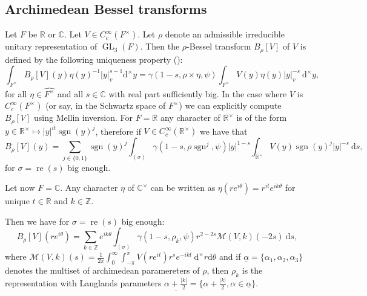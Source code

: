 \documentclass[a4paper,11pt]{amsart}
\theoremstyle{definition}
\newcommand{\R}{\mathbb{R}}
\newcommand{\Z}{\mathbb{Z}}
\newcommand{\gelle}{\operatorname{GL}}
\newcommand{\real}{\operatorname{re}}
\newcommand{\CC}{\mathbb{C}}
\begin{document}
\subsection{Archimedean Bessel transforms}Let $F$ be $\R$ or $\CC$. Let $V\in C_c^{\infty}(F^{\times})$. Let $\rho$ denote an admissible irreducible unitary representation of $\gelle_3(F)$.  
Then the $\rho$-Bessel transform $B_{\rho}[V]$ of $V$ is defined by the following uniqueness property (\cite{IchinoTemplier}): 
\begin{equation*}
     \int_{F^{\times}}B_{\rho}[{V}](y)\eta(y)^{-1}\vert{y}\vert_v^{s-1}\mathrm{d}^{\times}y =  \gamma(1-s,\rho\times \eta,\psi)\int_{F^{\times}}V(y)\eta(y)\vert{y}\vert_v^{-s}\ \mathrm{d}^{\times}y,
\end{equation*}
for all $\eta \in \widehat{F^{\times}}$ and all $s\in \CC$ with real part sufficiently big.
In the case where $V$ is $C_c^{\infty}(F^{\times})$ (or say, in the Schwartz space of $F^{\times}$) we can explicitly compute $B_{\rho}[V]$ using Mellin inversion.
For $F=\R$ any character of $\R^\times$ is of the form $y \in \R^{\times} \mapsto \vert{y}\vert^{it} \operatorname{sgn}(y)^{j}  $, therefore if $V \in C_c^{\infty}(\R^{\times})$ we have that 
\[B_{\rho}[V](y) = \sum_{j\in\{0,1\}} \operatorname{sgn}(y)^j\int_{(\sigma)}\gamma(1-s,\rho\operatorname{sgn}^{j},\psi)\vert{y}\vert^{1-s}\int_{\R^{\times}}V(y)\operatorname{sgn}(y)^j\vert{y}\vert^{-s}\ \mathrm{d}s,\]
for $\sigma=\real(s)$ big enough.


Let now $F=\CC$. Any character $\eta$ of $\CC^{\times}$ can be written as $\eta(re^{i\theta}) = r^{it}e^{ik\theta}$ for unique $t\in \R$ and $k\in \Z$. 

Then we have for $\sigma = \real(s)$ big enough:
\begin{equation*}
    B_{\rho}[V](re^{i\theta}) = \sum_{k\in \Z}e^{ik\theta}\int_{(\sigma)}\gamma(1-s,\rho_k,\psi)r^{2-2s}\mathcal{M}(V,k)(-2s) \ \mathrm{d}s,
\end{equation*}
where $\mathcal{M}(V,k)(s) = \frac{1}{2\pi}\int_{0}^{\infty}\int_{-\pi}^{\pi}V(re^{it})r^{s}e^{-ikt}\ \mathrm{d}^{\times}r \mathrm{d}\theta$ and if $\underline{\alpha} = \{\alpha_1,\alpha_2,\alpha_3\}$ denotes the multiset of archimedean paramereters of $\rho$, then $\rho_k$ is the representation with Langlands parameters $\underline{\alpha + \frac{\vert{k}\vert}{2}} = \{\alpha+\frac{\vert{k}\vert}{2},\alpha \in \underline{\alpha}\}.$
\end{document}
